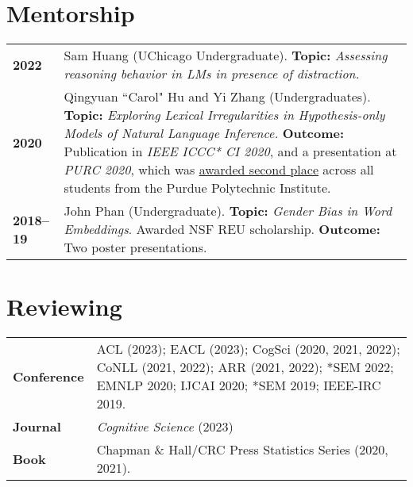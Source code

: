\documentclass[11pt]{article}
\begin{document}




\renewcommand*{\arraystretch}{1.5}

\section*{Mentorship}
\vspace{-1em}
\begin{longtable}{p{}  p{} }
    \textbf{2022} & Sam Huang (UChicago Undergraduate). \textbf{Topic:} \textit{Assessing reasoning behavior in LMs in presence of distraction.}\\
    \textbf{2020} & Qingyuan ``Carol" Hu and Yi Zhang (Undergraduates). \textbf{Topic:} \textit{Exploring Lexical Irregularities in Hypothesis-only Models of Natural Language Inference.} \textbf{Outcome:} Publication in \textit{IEEE ICCC* CI 2020}, and a presentation at \textit{PURC 2020}, which was \underline{awarded second place} across all students from the Purdue Polytechnic Institute.\\
    \textbf{2018--19} & John Phan (Undergraduate). \textbf{Topic:} \textit{Gender Bias in Word Embeddings}. Awarded NSF REU scholarship. \textbf{Outcome:} Two poster presentations.
\end{longtable}

\section*{Reviewing}
\vspace{-1em}
\begin{longtable}{p{}  p{} }
    \textbf{Conference} & ACL (2023); EACL (2023); CogSci (2020, 2021, 2022); CoNLL (2021, 2022); ARR (2021, 2022); *SEM 2022; EMNLP 2020; IJCAI 2020; *SEM 2019; IEEE-IRC 2019.\\
    \textbf{Journal} & \textit{Cognitive Science} (2023)\\
    \textbf{Book} & Chapman \& Hall/CRC Press Statistics Series (2020, 2021).
\end{longtable}
\end{document}
